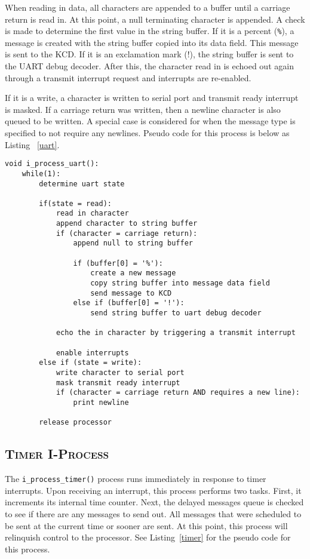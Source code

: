\documentclass[oneside]{report}
\begin{document}
When reading in data, all characters are appended to a buffer until a carriage
return is read in. At this point, a null terminating character is appended.  A
check is made to determine the first value in the string buffer. If it is a
percent (\texttt{\%}), a message is created with the string buffer copied into its data
field. This message is sent to the KCD. If it is an exclamation mark (!), the
string buffer is sent to the UART debug decoder. After this, the character read
in is echoed out again through a transmit interrupt request and interrupts are
re-enabled. 

If it is a write, a character is written to serial port and transmit
ready interrupt is masked. If a carriage return was written, then a
newline character is also queued to be written. A special case is
considered for when the message type is specified to not require any
newlines. Pseudo code for this process is below as Listing
~\ref{uart}.

\begin{lstlisting}
void i_process_uart():
    while(1):
        determine uart state

        if(state = read):
            read in character
            append character to string buffer
            if (character = carriage return):
                append null to string buffer            

                if (buffer[0] = '%'):
                    create a new message
                    copy string buffer into message data field
                    send message to KCD
                else if (buffer[0] = '!'):
                    send string buffer to uart debug decoder

            echo the in character by triggering a transmit interrupt

            enable interrupts
        else if (state = write):
            write character to serial port
            mask transmit ready interrupt
            if (character = carriage return AND requires a new line):
                print newline
            
        release processor
\end{lstlisting}

\subsection{\textsc{Timer I-Process}}
The \texttt{i\_process\_timer()} process runs immediately in response
to timer interrupts. Upon receiving an interrupt, this process
performs two tasks. First, it increments its internal time
counter. Next, the delayed messages queue is checked to see if there
are any messages to send out. All messages that were scheduled to be
sent at the current time or sooner are sent. At this point, this
process will relinquish control to the processor. See
Listing~\ref{timer} for the pseudo code for this process.
\end{document}
